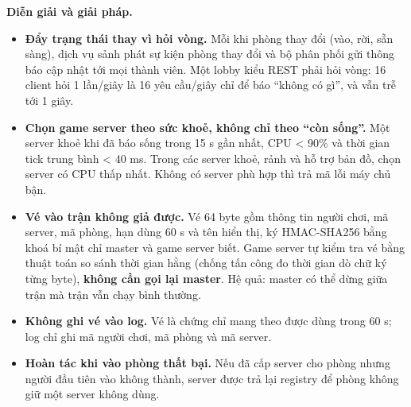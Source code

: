 \textbf{Diễn giải và giải pháp.}
\begin{itemize}
  \item \textbf{Đẩy trạng thái thay vì hỏi vòng.} Mỗi khi phòng thay đổi (vào, rời, sẵn sàng), dịch vụ sảnh
        phát sự kiện phòng thay đổi và bộ phân phối gửi thông báo cập nhật tới mọi thành viên. Một lobby kiểu
        REST phải hỏi vòng: 16 client hỏi 1 lần/giây là 16 yêu cầu/giây chỉ để báo ``không có gì'', và vẫn trễ tới 1 giây.
  \item \textbf{Chọn game server theo sức khoẻ, không chỉ theo ``còn sống''.} Một server khoẻ khi đã báo sống trong
        15 s gần nhất, CPU < 90\% và thời gian tick trung bình < 40 ms. Trong các server khoẻ, rảnh và hỗ trợ bản đồ,
        chọn server có CPU thấp nhất. Không có server phù hợp thì trả mã lỗi máy chủ bận.
  \item \textbf{Vé vào trận không giả được.} Vé 64 byte gồm thông tin người chơi, mã server, mã phòng, hạn dùng
        60 s và tên hiển thị, ký HMAC-SHA256 bằng khoá bí mật chỉ master và game server biết. Game server tự kiểm tra
        vé bằng thuật toán so sánh thời gian hằng (chống tấn công đo thời gian dò chữ ký từng byte),
        \textbf{không cần gọi lại master}. Hệ quả: master có thể dừng giữa trận mà trận vẫn chạy bình thường.
  \item \textbf{Không ghi vé vào log.} Vé là chứng chỉ mang theo được dùng trong 60 s; log chỉ ghi mã người chơi,
        mã phòng và mã server.
  \item \textbf{Hoàn tác khi vào phòng thất bại.} Nếu đã cấp server cho phòng nhưng người đầu tiên vào không thành, server
        được trả lại registry để phòng không giữ một server không dùng.
\end{itemize}

